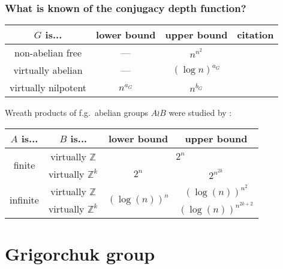 \documentclass[aspectratio=169,10pt]{beamer}
\begin{document}
\begin{frame}[t]
	\frametitle{What is known of the conjugacy depth function?}
	\def\arraystretch{1.25}
	\begin{center}
		\begin{tabular}{|c|c|c|c|}
			\hline
			$G$ is...           & lower bound & upper bound      & citation
			\\\hline\hline
			non-abelian free    & ---         & $n^{n^2}$        & {\color{OwlGreen}\textcite{LLM2017}}
			\\\hline
			virtually abelian   & ---         & $(\log n)^{a_G}$ & \multirow{2}{*}{{\color{OwlGreen}\textcite{DP2019}}}
			\\\cline{1-3}
			virtually nilpotent & $n^{a_G}$   & $n^{b_G}$        &
			\\\hline
		\end{tabular}
	\end{center}
	\bigskip
	Wreath products of f.g.~abelian groups $A\wr B$ were studied by {\color{OwlGreen}\textcite{MP2023}}: %
	\begin{center}
		\begin{tabular}{|c|c|c|c|}
			\hline
			$A$ is... & $B$ is...                & lower bound                    & upper bound
			\\\hline\hline
			\multirow{2}{*}{finite}
			          & virtually $\mathbb{Z}$   & \multicolumn{2}{c|}{$2^n$}                              \\
			\cline{2-4}
			          & virtually $\mathbb{Z}^k$ & $2^n$                          & $2^{n^{2k}}$
			\\\hline
			\multirow{2}{*}{infinite}
			          & virtually $\mathbb{Z}$   & \multirow{2}{*}{$(\log(n))^n$} & $(\log(n))^{n^2}$      \\
			\cline{2-2}\cline{4-4}
			          & virtually $\mathbb{Z}^k$ &                                & $(\log(n))^{n^{2k+2}}$
			\\\hline
		\end{tabular}
	\end{center}

	\nocite{MP2023}

	\nocite{P2020}
\end{frame}

\section{Grigorchuk group}
\end{document}
